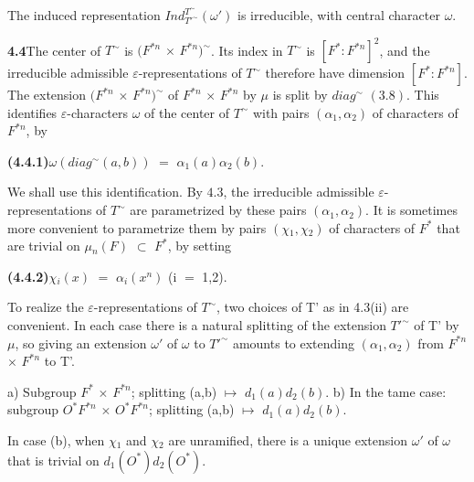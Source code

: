 \documentclass[10pt,a4paper]{article}
\begin{document}
\clearpage
{}
\label{d035-physical-020}
\par The induced representation $Ind_{T'^\sim}^{T^\sim}(\omega{}')$ is irreducible, with central character $\omega{}$.\par
\par\noindent\textbf{4.4}\quad The center of $T^\sim$ is $(F^{*n}$ $\times{}$ $F^{*n})^\sim$. Its index in $T^\sim$ is $[F^*:F^{*n}]^2$, and the irreducible admissible $\varepsilon{}$-representations of $T^\sim$ therefore have dimension $[F^*:F^{*n}]$. The extension $(F^{*n}$ $\times{}$ $F^{*n})^\sim$ of $F^{*n}$ $\times{}$ $F^{*n}$ by $\mu{}$ is split by $diag^\sim$ $(3.8)$. This identifies $\varepsilon{}$-characters $\omega{}$ of the center of $T^\sim$ with pairs $(\alpha{}_1,\alpha{}_2)$ of characters of $F^{*n}$, by\par
\par\noindent\textbf{(4.4.1)}\quad $\omega{}(diag^\sim(a,b))$ $=$ $\alpha{}_1(a)\alpha{}_2(b)$.\par
\par We shall use this identification. By $4.3$, the irreducible admissible $\varepsilon{}$-representations of $T^\sim$ are parametrized by these pairs $(\alpha{}_1,\alpha{}_2)$. It is sometimes more convenient to parametrize them by pairs $(\chi{}_1,\chi{}_2)$ of characters of $F^*$ that are trivial on $\mu{}_n(F)$ $\subset{}$ $F^*$, by setting\par
\par\noindent\textbf{(4.4.2)}\quad $\chi{}_i(x)$ $=$ $\alpha{}_i(x^n)$ (i $=$ 1,2).\par
\par To realize the $\varepsilon{}$-representations of $T^\sim$, two choices of T' as in 4.3(ii) are convenient. In each case there is a natural splitting of the extension $T'^\sim$ of T' by $\mu{}$, so giving an extension $\omega{}'$ of $\omega{}$ to $T'^\sim$ amounts to extending $(\alpha{}_1,\alpha{}_2)$ from $F^{*n}$ $\times{}$ $F^{*n}$ to T'.\par
\par a) Subgroup $F^*$ $\times{}$ $F^{*n}$; splitting (a,b) $\mapsto{}$ $d_1(a)d_2(b)$. b) In the tame case: subgroup $O^*F^{*n}$ $\times{}$ $O^*F^{*n}$; splitting (a,b) $\mapsto{}$ $d_1(a)d_2(b)$.\par
\par In case (b), when $\chi{}_1$ and $\chi{}_2$ are unramified, there is a unique extension $\omega{}'$ of $\omega{}$ that is trivial on $d_1(O^*)d_2(O^*)$.\par
\end{document}
